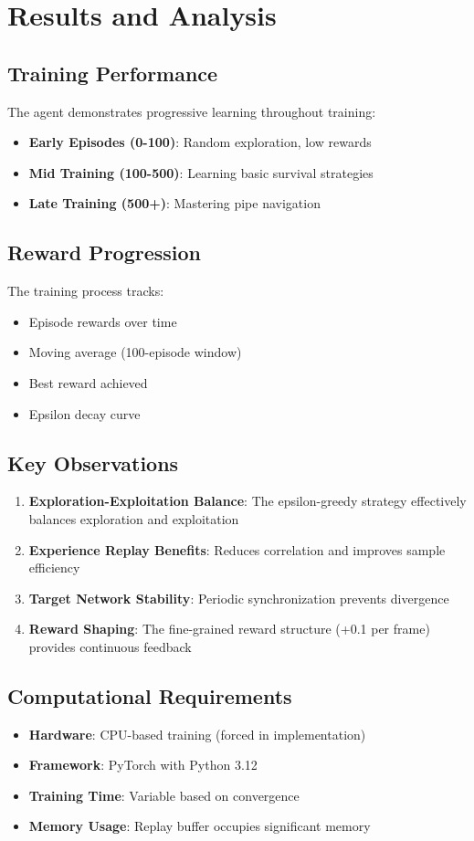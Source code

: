 \documentclass[12pt,a4paper]{article}
\begin{document}
\section{Results and Analysis}

\subsection{Training Performance}
The agent demonstrates progressive learning throughout training:
\begin{itemize}
    \item \textbf{Early Episodes (0-100)}: Random exploration, low rewards
    \item \textbf{Mid Training (100-500)}: Learning basic survival strategies
    \item \textbf{Late Training (500+)}: Mastering pipe navigation
\end{itemize}

\subsection{Reward Progression}
The training process tracks:
\begin{itemize}
    \item Episode rewards over time
    \item Moving average (100-episode window)
    \item Best reward achieved
    \item Epsilon decay curve
\end{itemize}

\subsection{Key Observations}
\begin{enumerate}
    \item \textbf{Exploration-Exploitation Balance}: The epsilon-greedy strategy effectively balances exploration and exploitation
    \item \textbf{Experience Replay Benefits}: Reduces correlation and improves sample efficiency
    \item \textbf{Target Network Stability}: Periodic synchronization prevents divergence
    \item \textbf{Reward Shaping}: The fine-grained reward structure (+0.1 per frame) provides continuous feedback
\end{enumerate}

\subsection{Computational Requirements}
\begin{itemize}
    \item \textbf{Hardware}: CPU-based training (forced in implementation)
    \item \textbf{Framework}: PyTorch with Python 3.12
    \item \textbf{Training Time}: Variable based on convergence
    \item \textbf{Memory Usage}: Replay buffer occupies significant memory
\end{itemize}
\end{document}
